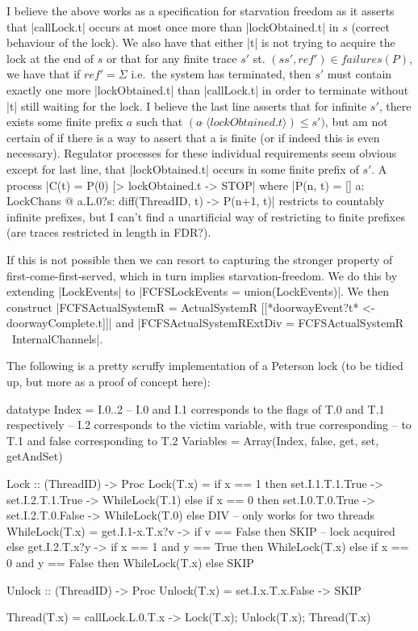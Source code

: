 I believe the above works as a specification for starvation freedom as it asserts that |callLock.t| occurs at most once more than |lockObtained.t| in $s$ (correct behaviour of the lock). We also have that either |t| is not trying to acquire the lock at the  end of $s$ or that for any finite trace $s'$ st. $(s\hat{ }s', ref') \in failures(P)$, we have that if $ref' = \Sigma$ i.e.~the system has terminated, then $s'$ must contain exactly one more |lockObtained.t| than |callLock.t| in order to terminate without |t| still waiting for the lock. I believe the last line asserts that for infinite $s'$, there exists some finite prefix $a$ such that $(a\, \hat{ }\,\langle lockObtained.t\rangle) \leq s')$, but am not certain of if there is a way to assert that a is finite (or if indeed this is even necessary). Regulator processes for these individual requirements seem obvious except for last line, that |lockObtained.t| occurs in some finite prefix of $s'$. A process |C(t) = P(0) [> lockObtained.t -> STOP| where |P(n, t) = [] a: LockChans @ a.L.0?s: diff(ThreadID, {t}) -> P(n+1, t)| restricts to countably infinite prefixes, but I can't find a unartificial way of restricting to finite prefixes (are traces restricted in length in FDR?).

If this is not possible then we can resort to capturing the stronger property of first-come-first-served, which in turn implies starvation-freedom. We do this by extending |LockEvents| to |FCFSLockEvents = union(LockEvents)|. We then construct |FCFSActualSystemR = ActualSystemR [[*doorwayEvent?t* <- doorwayComplete.t]]| and |FCFSActualSystemRExtDiv = FCFSActualSystemR \ InternalChannels|.

The following is a pretty scruffy implementation of a Peterson lock (to be tidied up, but more as a proof of concept here):
\begin {cspm}
  datatype Index = I.{0..2}
  -- I.0 and I.1 corresponds to the flags of T.0 and T.1 respectively
  -- I.2 corresponds to the victim variable, with true corresponding 
  --     to T.1 and false corresponding to T.2
  Variables = Array(Index, false, get, set, getAndSet)

  Lock :: (ThreadID) -> Proc
  Lock(T.x) = if x == 1 then set.I.1.T.1.True -> set.I.2.T.1.True -> WhileLock(T.1)
              else if x == 0 then set.I.0.T.0.True -> set.I.2.T.0.False -> WhileLock(T.0)
              else DIV -- only works for two threads
  WhileLock(T.x) = get.I.1-x.T.x?v -> if v == False then SKIP -- lock acquired
                                      else get.I.2.T.x?y ->
                                        if x == 1 and y == True then WhileLock(T.x)
                                        else if x == 0 and y == False then WhileLock(T.x)
                                        else SKIP

  Unlock :: (ThreadID) -> Proc
  Unlock(T.x) = set.I.x.T.x.False -> SKIP

  Thread(T.x) = callLock.L.0.T.x -> Lock(T.x); Unlock(T.x); Thread(T.x)
\end{cspm}

